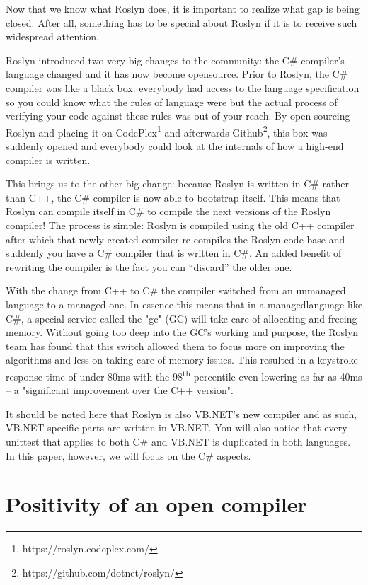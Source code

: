 Now that we know what Roslyn does, it is important to realize what gap is being closed. After all, something has to be special about Roslyn if it is to receive such widespread attention.

Roslyn introduced two very big changes to the community: the C\# compiler’s language changed and it has now become \gls{opensource}. Prior to Roslyn, the C\# compiler was like a black box: everybody had access to the language specification so you could know what the rules of language were but the actual process of verifying your code against these rules was out of your reach. By open-sourcing Roslyn and placing it on CodePlex\footnote{https://roslyn.codeplex.com/} and afterwards Github\footnote{https://github.com/dotnet/roslyn/}, this box was suddenly opened and everybody could look at the internals of how a high-end compiler is written.

This brings us to the other big change: because Roslyn is written in C\# rather than C++, the C\# compiler is now able to \gls{bootstrap} itself. This means that Roslyn can compile itself in C\# to compile the next versions of the Roslyn compiler! The process is simple: Roslyn is compiled using the old C++ compiler after which that newly created compiler re-compiles the Roslyn code base and suddenly you have a C\# compiler that is written in C\#. 
An added benefit of rewriting the compiler is the fact you can “discard” the older one.

With the change from C++ to C\# the \gls{compiler} switched from an unmanaged language to a managed one. In essence this means that in a \gls{managedlanguage} like C\#, a special service called the "\gls{gc}" (GC) will take care of allocating and freeing memory. Without going too deep into the GC's working and purpose, the Roslyn team has found that this switch allowed them to focus more on improving the algorithms and less on taking care of memory issues. This resulted in a keystroke response time of under 80ms with the 98\textsuperscript{th} percentile even lowering as far as 40ms -- a "significant improvement over the C++ version".\parencite{Wischik2014}

It should be noted here that Roslyn is also VB.NET's new compiler and as such, VB.NET-specific parts are written in VB.NET. You will also notice that every \gls{unittest} that applies to both C\# and VB.NET is duplicated in both languages. In this paper, however, we will focus on the C\# aspects.

\newpage

\section{Positivity of an open compiler}
\label{sec:intro-pos-comp}

